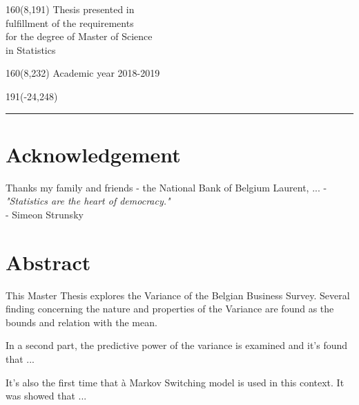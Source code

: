 \documentclass[12pt,a4paper,oneside]{book}
\begin{document}
%
\begin{textblock}{160}(8,191)
\textblockcolour{}
\vspace{-\parskip}
\flushright
Thesis presented in\\[4.5pt]
fulfillment of the requirements\\[4.5pt]
for the degree of Master of Science\\[4.5pt]
in Statistics\\
\end{textblock}
%
\begin{textblock}{160}(8,232)
\textblockcolour{}
\vspace{-\parskip}
\flushright
Academic year 2018-2019
\end{textblock}
%
\begin{textblock}{191}(-24,248)
{\color{blueline}\rule{550pt}{5.5pt}}
\end{textblock}
%
\vfill
\newpage

\rmfamily
\setcounter{page}{0}
\pagestyle{plain}



\chapter*{Acknowledgement}
Thanks my family and friends - the National Bank of Belgium Laurent, ... - \\

\textit{"Statistics are the heart of democracy." }\\
- Simeon Strunsky

\chapter*{Abstract}

This Master Thesis explores the Variance of the Belgian Business Survey. 
Several finding concerning the nature and properties of the Variance are found as the bounds and relation with the mean.

In a second part, the predictive power of the variance is examined and it's found that ...

It's also the first time that à Markov Switching model is used in this context. It was showed that ...
\end{document}
